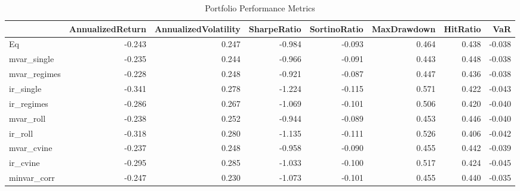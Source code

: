 \begin{table}

\caption{Portfolio Performance Metrics}
\centering
\begin{tabular}[t]{lrrrrrrr}
\toprule
  & AnnualizedReturn & AnnualizedVolatility & SharpeRatio & SortinoRatio & MaxDrawdown & HitRatio & VaR\\
\midrule
Eq & -0.243 & 0.247 & -0.984 & -0.093 & 0.464 & 0.438 & -0.038\\
mvar\_single & -0.235 & 0.244 & -0.966 & -0.091 & 0.443 & 0.448 & -0.038\\
mvar\_regimes & -0.228 & 0.248 & -0.921 & -0.087 & 0.447 & 0.436 & -0.038\\
ir\_single & -0.341 & 0.278 & -1.224 & -0.115 & 0.571 & 0.422 & -0.043\\
ir\_regimes & -0.286 & 0.267 & -1.069 & -0.101 & 0.506 & 0.420 & -0.040\\
\addlinespace
mvar\_roll & -0.238 & 0.252 & -0.944 & -0.089 & 0.453 & 0.446 & -0.040\\
ir\_roll & -0.318 & 0.280 & -1.135 & -0.111 & 0.526 & 0.406 & -0.042\\
mvar\_cvine & -0.237 & 0.248 & -0.958 & -0.090 & 0.455 & 0.442 & -0.039\\
ir\_cvine & -0.295 & 0.285 & -1.033 & -0.100 & 0.517 & 0.424 & -0.045\\
minvar\_corr & -0.247 & 0.230 & -1.073 & -0.101 & 0.455 & 0.440 & -0.035\\
\bottomrule
\end{tabular}
\end{table}
